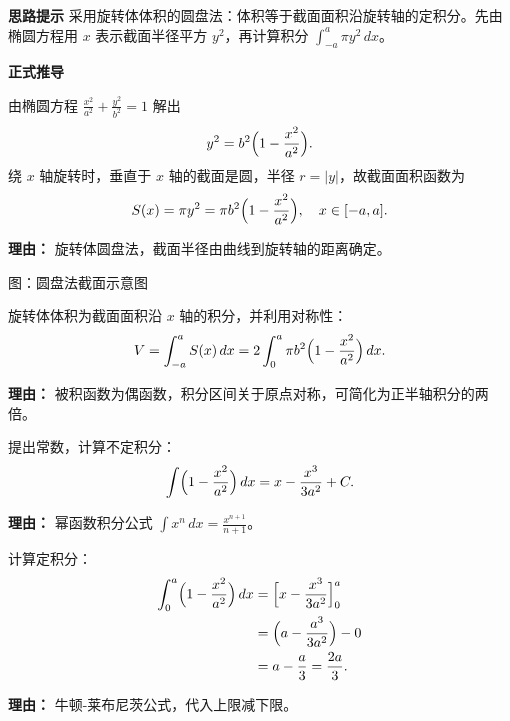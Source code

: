 \begin{proofbox}
	\textbf{\textcolor{CProof}{思路提示}}
	采用旋转体体积的圆盘法：体积等于截面面积沿旋转轴的定积分。先由椭圆方程用 \(x\) 表示截面半径平方 \(y^{2}\)，再计算积分 \(\int_{-a}^{a} \pi y^{2}\,dx\)。

	\medskip
	\textbf{\textcolor{CProof}{正式推导}}
	\begin{description}[style=nextline, leftmargin=2.8em, labelsep=0.5em, itemsep=0.55em]
		\item[\textbf{步骤一（写出截面面积）：}]
		      由椭圆方程 \(\frac{x^{2}}{a^{2}}+\frac{y^{2}}{b^{2}}=1\) 解出
		      \[
			      y^{2}=b^{2}\Bigl(1-\frac{x^{2}}{a^{2}}\Bigr).
		      \]
		      绕 \(x\) 轴旋转时，垂直于 \(x\) 轴的截面是圆，半径 \(r=|y|\)，故截面面积函数为
		      \[
			      S(x)=\pi y^{2}=\pi b^{2}\Bigl(1-\frac{x^{2}}{a^{2}}\Bigr),\quad x\in[-a,a].
		      \]
		      \par\textbf{理由：} 旋转体圆盘法，截面半径由曲线到旋转轴的距离确定。
		      \begin{center}
			      

			      \vspace{0.4em}
			      {\small 图：圆盘法截面示意图}
		      \end{center}
		\item[\textbf{步骤二（建立积分式）：}]
		      旋转体体积为截面面积沿 \(x\) 轴的积分，并利用对称性：
		      \[
			      V=\int_{-a}^{a} S(x)\,dx = 2\int_{0}^{a} \pi b^{2}\Bigl(1-\frac{x^{2}}{a^{2}}\Bigr)\,dx.
		      \]
		      \par\textbf{理由：} 被积函数为偶函数，积分区间关于原点对称，可简化为正半轴积分的两倍。

		\item[\textbf{步骤三（计算原函数）：}]
		      提出常数，计算不定积分：
		      \[
			      \int \Bigl(1-\frac{x^{2}}{a^{2}}\Bigr)\,dx = x - \frac{x^{3}}{3a^{2}} + C.
		      \]
		      \par\textbf{理由：} 幂函数积分公式 \(\int x^{n}\,dx = \frac{x^{n+1}}{n+1}\)。

		\item[\textbf{步骤四（代入上下限）：}]
		      计算定积分：
		      \[
			      \begin{aligned}
				      \int_{0}^{a} \Bigl(1-\frac{x^{2}}{a^{2}}\Bigr)\,dx
				       & = \Bigl[x - \frac{x^{3}}{3a^{2}}\Bigr]_{0}^{a} \\
				       & = \Bigl(a - \frac{a^{3}}{3a^{2}}\Bigr) - 0     \\
				       & = a - \frac{a}{3} = \frac{2a}{3}.
			      \end{aligned}
		      \]
		      \par\textbf{理由：} 牛顿-莱布尼茨公式，代入上限减下限。


\end{description}
\end{proofbox}
